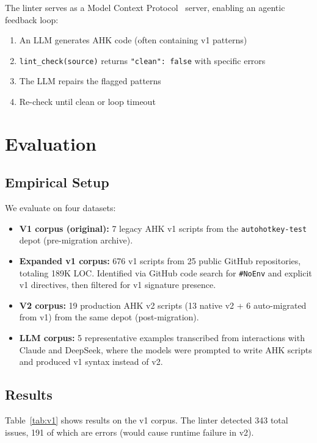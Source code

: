 \documentclass[11pt,a4paper]{article}
\begin{document}
\begin{enumerate}
The linter serves as a Model Context Protocol~\cite{mcp} server, enabling an agentic feedback loop:

\begin{enumerate}
  \item An LLM generates AHK code (often containing v1 patterns)
  \item \texttt{lint\_check(source)} returns {\tt "clean": false} with specific errors
  \item The LLM repairs the flagged patterns
  \item Re-check until clean or loop timeout
\end{enumerate}

\section{Evaluation}

\subsection{Empirical Setup}

We evaluate on four datasets:

\begin{itemize}
  \item \textbf{V1 corpus (original):} 7 legacy AHK v1 scripts from the \texttt{autohotkey-test} depot (pre-migration archive).
  \item \textbf{Expanded v1 corpus:} 676 v1 scripts from 25 public GitHub repositories, totaling 189K LOC. Identified via GitHub code search for \texttt{\#NoEnv} and explicit v1 directives, then filtered for v1 signature presence.
  \item \textbf{V2 corpus:} 19 production AHK v2 scripts (13 native v2 + 6 auto-migrated from v1) from the same depot (post-migration).
  \item \textbf{LLM corpus:} 5 representative examples transcribed from interactions with Claude and DeepSeek, where the models were prompted to write AHK scripts and produced v1 syntax instead of v2.
\end{itemize}

\subsection{Results}

Table~\ref{tab:v1} shows results on the v1 corpus. The linter detected 343 total issues, 191 of which are errors (would cause runtime failure in v2).


\end{enumerate}
\end{document}
